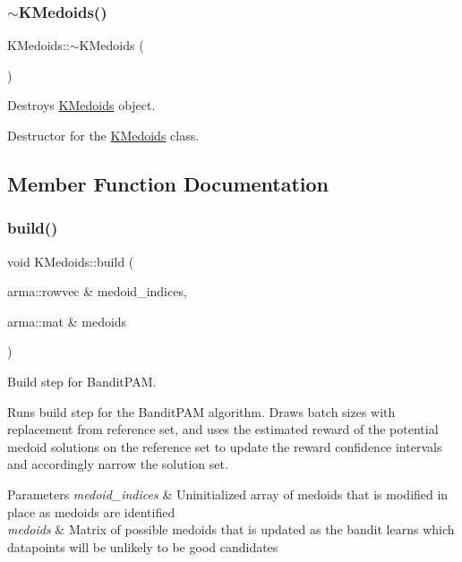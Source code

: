\subsubsection{\texorpdfstring{$\sim$\+K\+Medoids()}{~KMedoids()}}
{\footnotesize\ttfamily K\+Medoids\+::$\sim$\+K\+Medoids (\begin{DoxyParamCaption}{ }\end{DoxyParamCaption})}



Destroys \hyperlink{classKMedoids}{K\+Medoids} object. 

Destructor for the \hyperlink{classKMedoids}{K\+Medoids} class. 

\subsection{Member Function Documentation}
\mbox{\label{classKMedoids_af63f9e9a234315783a9f77dfa8a0cbc6}} 
\subsubsection{\texorpdfstring{build()}{build()}}
{\footnotesize\ttfamily void K\+Medoids\+::build (\begin{DoxyParamCaption}\item[{arma\+::rowvec \&}]{medoid\+\_\+indices,  }\item[{arma\+::mat \&}]{medoids }\end{DoxyParamCaption})\hspace{0.3cm}{\ttfamily [private]}}



Build step for Bandit\+P\+AM. 

Runs build step for the Bandit\+P\+AM algorithm. Draws batch sizes with replacement from reference set, and uses the estimated reward of the potential medoid solutions on the reference set to update the reward confidence intervals and accordingly narrow the solution set.


\begin{DoxyParams}{Parameters}
{\em medoid\+\_\+indices} & Uninitialized array of medoids that is modified in place as medoids are identified \\
\hline
{\em medoids} & Matrix of possible medoids that is updated as the bandit learns which datapoints will be unlikely to be good candidates \\
\hline
\end{DoxyParams}
\mbox{\label{classKMedoids_ae5ad25637d225be8c31bc3c934a8ec26}} 
